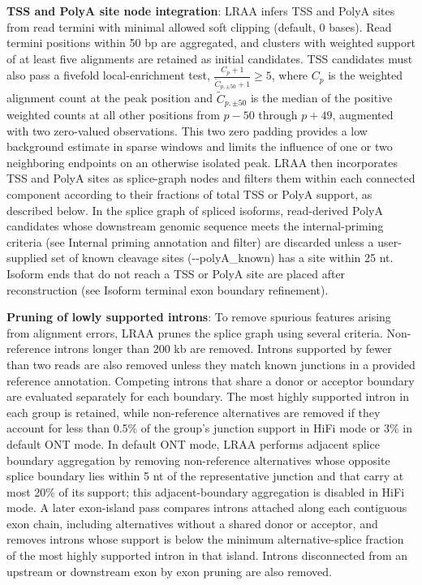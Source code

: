 \textbf{TSS and PolyA site node integration}: LRAA infers TSS and PolyA sites from read termini with minimal allowed soft clipping (default, 0 bases). Read termini positions within 50 bp are aggregated, and clusters with weighted support of at least five alignments are retained as initial candidates. TSS candidates must also pass a fivefold local-enrichment test, \(\frac{C_p+1}{\widetilde{C}_{p,\pm 50}+1}\geq 5\), where \(C_p\) is the weighted alignment count at the peak position and \(\widetilde{C}_{p,\pm 50}\) is the median of the positive weighted counts at all other positions from \(p-50\) through \(p+49\), augmented with two zero-valued observations. This two zero padding provides a low background estimate in sparse windows and limits the influence of one or two neighboring endpoints on an otherwise isolated peak. LRAA then incorporates TSS and PolyA sites as splice-graph nodes and filters them within each connected component according to their fractions of total TSS or PolyA support, as described below. In the splice graph of spliced isoforms, read-derived PolyA candidates whose downstream genomic sequence meets the internal-priming criteria (see Internal priming annotation and filter) are discarded unless a user-supplied set of known cleavage sites (-\/-polyA\_known) has a site within 25 nt. Isoform ends that do not reach a TSS or PolyA site are placed after reconstruction (see Isoform terminal exon boundary refinement).

\textbf{Pruning of lowly supported introns}: To remove spurious features arising from alignment errors, LRAA prunes the splice graph using several criteria. Non-reference introns longer than 200 kb are removed. Introns supported by fewer than two reads are also removed unless they match known junctions in a provided reference annotation. Competing introns that share a donor or acceptor boundary are evaluated separately for each boundary. The most highly supported intron in each group is retained, while non-reference alternatives are removed if they account for less than 0.5\% of the group's junction support in HiFi mode or 3\% in default ONT mode. In default ONT mode, LRAA performs adjacent splice boundary aggregation by removing non-reference alternatives whose opposite splice boundary lies within 5 nt of the representative junction and that carry at most 20\% of its support; this adjacent-boundary aggregation is disabled in HiFi mode. A later exon-island pass compares introns attached along each contiguous exon chain, including alternatives without a shared donor or acceptor, and removes introns whose support is below the minimum alternative-splice fraction of the most highly supported intron in that island. Introns disconnected from an upstream or downstream exon by exon pruning are also removed.

